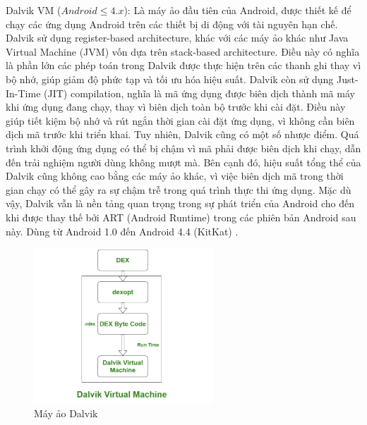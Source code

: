   Dalvik VM ($Android \leq 4.x$): Là máy ảo đầu tiên của Android,  được thiết kế để chạy các ứng dụng Android trên các thiết bị di động với tài nguyên hạn chế. Dalvik sử dụng register-based architecture, khác với các máy ảo khác như Java Virtual Machine (JVM) vốn dựa trên stack-based architecture. Điều này có nghĩa là phần lớn các phép toán trong Dalvik được thực hiện trên các thanh ghi thay vì bộ nhớ, giúp giảm độ phức tạp và tối ưu hóa hiệu suất. Dalvik còn sử dụng Just-In-Time (JIT) compilation, nghĩa là mã ứng dụng được biên dịch thành mã máy khi ứng dụng đang chạy, thay vì biên dịch toàn bộ trước khi cài đặt. Điều này giúp tiết kiệm bộ nhớ và rút ngắn thời gian cài đặt ứng dụng, vì không cần biên dịch mã trước khi triển khai. Tuy nhiên, Dalvik cũng có một số nhược điểm. Quá trình khởi động ứng dụng có thể bị chậm vì mã phải được biên dịch khi chạy, dẫn đến trải nghiệm người dùng không mượt mà. Bên cạnh đó, hiệu suất tổng thể của Dalvik cũng không cao bằng các máy ảo khác, vì việc biên dịch mã trong thời gian chạy có thể gây ra sự chậm trễ trong quá trình thực thi ứng dụng. Mặc dù vậy, Dalvik vẫn là nền tảng quan trọng trong sự phát triển của Android cho đến khi được thay thế bởi ART (Android Runtime) trong các phiên bản Android sau này.
  Dùng từ Android 1.0 đến Android 4.4 (KitKat) \cite{art-dalvik}.
  \begin{figure}[H] 
    \centering
    \includegraphics[width=0.6\textwidth]{images/DalvikVM.png}
    \caption{Máy ảo Dalvik}
    \label{fig:android}
\end{figure}  

